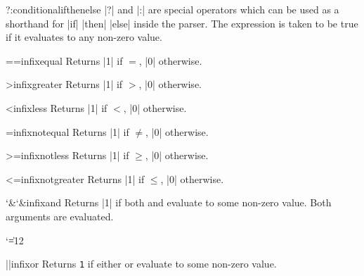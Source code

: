 \begin{math-operators}{?}{:}{conditional}{ifthenelse}
    |?| and |:| are special operators which can be used as a shorthand for |if|
     |then|  |else|  inside the parser. The expression
     is taken to be true if it evaluates to any non-zero value.
\end{math-operators}

\begin{math-operator}{==}{infix}{equal}
    Returns |1| if $=$, |0| otherwise.
\end{math-operator}

\begin{math-operator}{>}{infix}{greater}
    Returns |1| if $>$, |0| otherwise.
\end{math-operator}

\begin{math-operator}{<}{infix}{less}
    Returns |1| if $<$, |0| otherwise.
\end{math-operator}

\begin{math-operator}{\protect\exclamationmarktext=}{infix}{notequal}
    Returns |1| if $\neq$, |0| otherwise.
\end{math-operator}

\begin{math-operator}{>=}{infix}{notless}
    Returns |1| if $\geq$, |0| otherwise.
\end{math-operator}

\begin{math-operator}{<=}{infix}{notgreater}
    Returns |1| if $\leq$, |0| otherwise.
\end{math-operator}

\begin{math-operator}{{\char`\&}{\char`\&}}{infix}{and}
    Returns |1| if both  and  evaluate to some non-zero value.
    Both arguments are evaluated.
\end{math-operator}

{
 \catcode`\|=12
\begin{math-operator}[no index]{||}{infix}{or}
    Returns {\tt 1} if either  or  evaluate to some non-zero
    value.
\end{math-operator}
}

